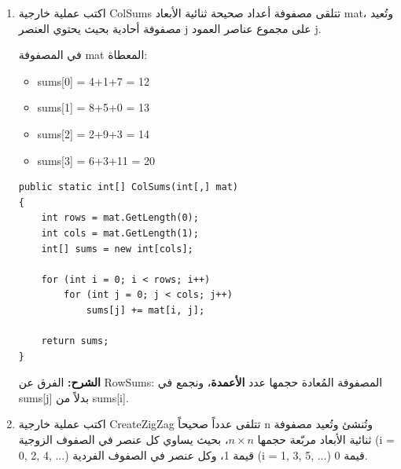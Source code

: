 \documentclass[14pt]{extarticle}
\begin{document}
\begin{enumerate}[itemsep=2em]
\item
اكتب عملية خارجية \textenglish{ColSums} تتلقى مصفوفة أعداد صحيحة ثنائية الأبعاد \textenglish{mat}، وتُعيد مصفوفة أحادية بحيث يحتوي العنصر \textenglish{j} على مجموع عناصر العمود \textenglish{j}.

\begin{boxExample}
في المصفوفة \textenglish{mat} المعطاة:
\begin{itemize}[itemsep=1pt]
    \item \textenglish{sums[0] = 4+1+7 = 12}
    \item \textenglish{sums[1] = 8+5+0 = 13}
    \item \textenglish{sums[2] = 2+9+3 = 14}
    \item \textenglish{sums[3] = 6+3+11 = 20}
\end{itemize}
\end{boxExample}

\ifwithsols
\begin{boxSolution}
\begin{boxCode}
\begin{english}
\begin{verbatim}
public static int[] ColSums(int[,] mat)
{
    int rows = mat.GetLength(0);
    int cols = mat.GetLength(1);
    int[] sums = new int[cols];

    for (int i = 0; i < rows; i++)
        for (int j = 0; j < cols; j++)
            sums[j] += mat[i, j];

    return sums;
}
\end{verbatim}
\end{english}
\end{boxCode}
\textbf{الشرح:} الفرق عن \textenglish{RowSums}: المصفوفة المُعادة حجمها عدد \textbf{الأعمدة}، ونجمع في \textenglish{sums[j]} بدلاً من \textenglish{sums[i]}.
\end{boxSolution}
\clearpage
\fi

\item
اكتب عملية خارجية \textenglish{CreateZigZag} تتلقى عدداً صحيحاً \textenglish{n} وتُنشئ وتُعيد مصفوفة ثنائية الأبعاد مربّعة حجمها $n \times n$، بحيث يساوي كل عنصر في الصفوف الزوجية (\textenglish{i = 0, 2, 4, ...}) قيمة \textenglish{1}، وكل عنصر في الصفوف الفردية (\textenglish{i = 1, 3, 5, ...}) قيمة \textenglish{0}.


\end{enumerate}
\end{document}
